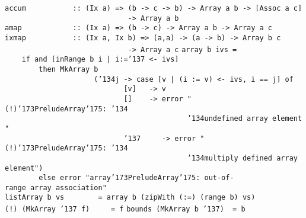 \mbox{\tt accum\ \ \ \ \ \ \ \ \ \ \ ::\ (Ix\ a)\ =>\ (b\ ->\ c\ ->\ b)\ ->\ Array\ a\ b\ ->\ [Assoc\ a\ c]}\\
\mbox{\tt \ \ \ \ \ \ \ \ \ \ \ \ \ \ \ \ \ \ \ \ \ \ \ \ \ \ \ \ \ ->\ Array\ a\ b}\\
\mbox{\tt amap\ \ \ \ \ \ \ \ \ \ \ \ ::\ (Ix\ a)\ =>\ (b\ ->\ c)\ ->\ Array\ a\ b\ ->\ Array\ a\ c}\\
\mbox{\tt ixmap\ \ \ \ \ \ \ \ \ \ \ ::\ (Ix\ a,\ Ix\ b)\ =>\ (a,a)\ ->\ (a\ ->\ b)\ ->\ Array\ b\ c}\\
\mbox{\tt \ \ \ \ \ \ \ \ \ \ \ \ \ \ \ \ \ \ \ \ \ \ \ \ \ \ \ \ \ ->\ Array\ a\ c}
%
%
%
%
%
%
%
%
%
%
%
%
\eprogB\noindent\bprogB
\mbox{\tt array\ b\ ivs\ =}\\
\mbox{\tt \ \ \ \ if\ and\ [inRange\ b\ i\ |\ i:={\char'137}\ <-\ ivs]}\\
\mbox{\tt \ \ \ \ \ \ \ \ then\ MkArray\ b}\\
\mbox{\tt \ \ \ \ \ \ \ \ \ \ \ \ \ \ \ \ \ \ \ \ \ ({\char'134}j\ ->\ case\ [v\ |\ (i\ :=\ v)\ <-\ ivs,\ i\ ==\ j]\ of}\\
\mbox{\tt \ \ \ \ \ \ \ \ \ \ \ \ \ \ \ \ \ \ \ \ \ \ \ \ \ \ \ \ [v]\ \ \ ->\ v}\\
\mbox{\tt \ \ \ \ \ \ \ \ \ \ \ \ \ \ \ \ \ \ \ \ \ \ \ \ \ \ \ \ []\ \ \ \ ->\ error\ "(!){\char'173}PreludeArray{\char'175}:\ {\char'134}}\\
\mbox{\tt \ \ \ \ \ \ \ \ \ \ \ \ \ \ \ \ \ \ \ \ \ \ \ \ \ \ \ \ \ \ \ \ \ \ \ \ \ \ \ \ \ \ \ {\char'134}undefined\ array\ element"}\\
\mbox{\tt \ \ \ \ \ \ \ \ \ \ \ \ \ \ \ \ \ \ \ \ \ \ \ \ \ \ \ \ {\char'137}\ \ \ \ \ ->\ error\ "(!){\char'173}PreludeArray{\char'175}:\ {\char'134}}\\
\mbox{\tt \ \ \ \ \ \ \ \ \ \ \ \ \ \ \ \ \ \ \ \ \ \ \ \ \ \ \ \ \ \ \ \ \ \ \ \ \ \ \ \ \ \ \ {\char'134}multiply\ defined\ array\ element")}\\
\mbox{\tt \ \ \ \ \ \ \ \ else\ error\ "array{\char'173}PreludeArray{\char'175}:\ out-of-range\ array\ association"}
\eprogB\noindent\bprogB
\mbox{\tt listArray\ b\ vs\ \ \ \ \ \ \ \ =\ array\ b\ (zipWith\ (:=)\ (range\ b)\ vs)}
\eprogB\noindent\bprogB
\mbox{\tt (!)\ (MkArray\ {\char'137}\ f)\ \ \ \ \ =\ f}
\eprogB\noindent\bprogB
\mbox{\tt bounds\ (MkArray\ b\ {\char'137})\ \ =\ b}
\eprogB\noindent\bprogB
